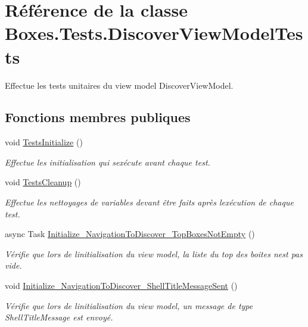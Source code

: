 \hypertarget{class_boxes_1_1_tests_1_1_discover_view_model_tests}{}\section{Référence de la classe Boxes.\+Tests.\+Discover\+View\+Model\+Tests}
\label{class_boxes_1_1_tests_1_1_discover_view_model_tests}


Effectue les tests unitaires du view model Discover\+View\+Model.  


\subsection*{Fonctions membres publiques}
\begin{DoxyCompactItemize}
\item 
void \hyperlink{class_boxes_1_1_tests_1_1_discover_view_model_tests_aa2175b8dd4f6cc0ba1c16eec8ff1b140}{Tests\+Initialize} ()
\begin{DoxyCompactList}\small\item\em Effectue les initialisation qui s\textquotesingle{}exécute avant chaque test. \end{DoxyCompactList}\item 
void \hyperlink{class_boxes_1_1_tests_1_1_discover_view_model_tests_aa36ffc931a191d58fb0227f4dbd03f8b}{Tests\+Cleanup} ()
\begin{DoxyCompactList}\small\item\em Effectue les nettoyages de variables devant être faits après l\textquotesingle{}exécution de chaque test. \end{DoxyCompactList}\item 
async Task \hyperlink{class_boxes_1_1_tests_1_1_discover_view_model_tests_a2c8d19575ffefacdf722d8f01a1ff291}{Initialize\+\_\+\+Navigation\+To\+Discover\+\_\+\+Top\+Boxes\+Not\+Empty} ()
\begin{DoxyCompactList}\small\item\em Vérifie que lors de l\textquotesingle{}initialisation du view model, la liste du top des boites n\textquotesingle{}est pas vide. \end{DoxyCompactList}\item 
void \hyperlink{class_boxes_1_1_tests_1_1_discover_view_model_tests_a8ea51a8eda5391c836a8c92ef4f0392d}{Initialize\+\_\+\+Navigation\+To\+Discover\+\_\+\+Shell\+Title\+Message\+Sent} ()
\begin{DoxyCompactList}\small\item\em Vérifie que lors de l\textquotesingle{}initialisation du view model, un message de type Shell\+Title\+Message est envoyé. \end{DoxyCompactList}\item 

\end{DoxyCompactItemize}

